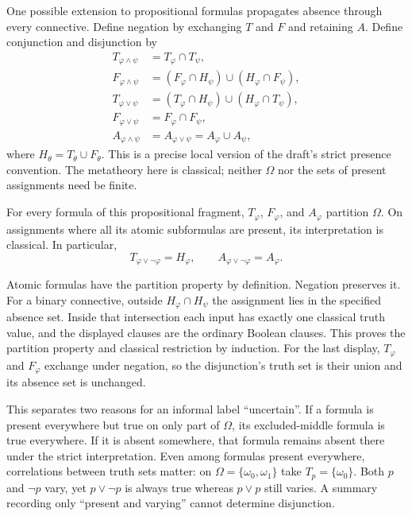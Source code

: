 One possible extension to propositional formulas propagates absence through
every connective. Define
negation by exchanging $T$ and $F$ and retaining $A$. Define conjunction
and disjunction by
\[
\begin{split}
T_{\varphi\land\psi}&=T_\varphi\cap T_\psi,\\
F_{\varphi\land\psi}&=(F_\varphi\cap H_\psi)
                         \cup(H_\varphi\cap F_\psi),\\
T_{\varphi\lor\psi}&=(T_\varphi\cap H_\psi)
                         \cup(H_\varphi\cap T_\psi),\\
F_{\varphi\lor\psi}&=F_\varphi\cap F_\psi,\\
A_{\varphi\land\psi}&=A_{\varphi\lor\psi}=A_\varphi\cup A_\psi,
\end{split}
\]
where $H_\theta=T_\theta\cup F_\theta$. This is a precise local version
of the draft's strict presence convention. The metatheory here is
classical; neither $\Omega$ nor the sets of present assignments need be
finite.

\begin{lemma}
For every formula of this propositional fragment, $T_\varphi$,
$F_\varphi$, and $A_\varphi$ partition $\Omega$. On assignments where
all its atomic subformulas are present, its interpretation is classical.
In particular,
\[
T_{\varphi\lor\neg\varphi}=H_\varphi,
\qquad
A_{\varphi\lor\neg\varphi}=A_\varphi.
\]
\end{lemma}
\Proof
Atomic formulas have the partition property by definition. Negation
preserves it. For a binary connective, outside
$H_\varphi\cap H_\psi$ the assignment lies in the specified absence
set. Inside that intersection each input has exactly one classical truth
value, and the displayed clauses are the ordinary Boolean clauses.
This proves the partition property and classical restriction by induction.
For the last display, $T_\varphi$ and $F_\varphi$ exchange under negation,
so the disjunction's truth set is their union and its absence set is
unchanged.
\Done

This separates two reasons for an informal label ``uncertain''. If a
formula is present everywhere but true on only part of $\Omega$, its
excluded-middle formula is true everywhere. If it is absent somewhere,
that formula remains absent there under the strict interpretation.
Even among formulas present everywhere, correlations between truth sets matter: on
$\Omega=\{\omega_0,\omega_1\}$ take $T_p=\{\omega_0\}$.
Both $p$ and $\neg p$ vary, yet $p\lor\neg p$ is always true whereas
$p\lor p$ still varies. A summary recording only ``present and varying''
cannot determine disjunction.

